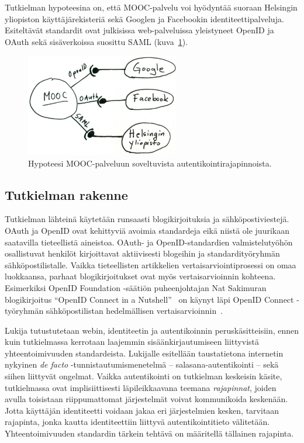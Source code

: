 \documentclass[finnish,gradu]{tktltiki}
\begin{document}
Tutkielman hypoteesina on, että MOOC-palvelu voi hyödyntää suoraan Helsingin yliopiston käyttäjärekisteriä sekä Googlen ja Facebookin identiteettipalveluja. Esiteltävät standardit ovat julkisissa web-palveluissa yleistyneet OpenID ja OAuth sekä sisäverkoissa suosittu SAML (kuva~\ref{fig:mooc-autentikointirajapinnat}).

\begin{figure}
  \centering
  \includegraphics[width=0.6\textwidth]{images/mooc-autentikointirajapinnat.jpg}
  \caption{Hypoteesi MOOC-palveluun soveltuvista autentikointirajapinnoista.}
  \label{fig:mooc-autentikointirajapinnat}
\end{figure}




\subsection{Tutkielman rakenne} %
\label{sub:tutkielman_rakenne}

Tutkielman lähteinä käytetään runsaasti blogikirjoituksia ja sähköpostiviestejä. OAuth ja OpenID ovat kehittyviä avoimia standardeja eikä niistä ole juurikaan saatavilla tieteellistä aineistoa. OAuth- ja OpenID-standardien valmistelutyöhön osallistuvat henkilöt kirjoittavat aktiivisesti blogeihin ja standardityöryhmän sähköpostilistalle. Vaikka tieteellisten artikkelien vertaisarviointiprosessi on omaa luokkaansa, parhaat blogikirjoitukset ovat myös vertaisarvioinnin kohteena. Esimerkiksi OpenID Foundation -säätiön puheenjohtajan Nat Sakimuran blogikirjoitus ``OpenID Connect in a Nutshell''~\cite{sakimura_openid_c_nutshell_2012} on käynyt läpi OpenID Connect -työryhmän sähköpostilistan hedelmällisen vertaisarvioinnin~\cite{openid_c_nutshell_peer_review_1_2012, openid_c_nutshell_peer_review_2_2012}.

Lukija tutustutetaan webin, identiteetin ja autentikoinnin peruskäsitteisiin, ennen kuin tutkielmassa kerrotaan laajemmin sisäänkirjautumiseen liittyvistä yhteentoimivuuden standardeista. Lukijalle esitellään taustatietona internetin nykyinen \emph{de facto} -tunnistautumismenetelmä -- salasana-autentikointi -- sekä siihen liittyvät ongelmat. Vaikka autentikointi on tutkielman keskeisin käsite, tutkielmassa ovat implisiittisesti läpileikkaavana teemana \emph{rajapinnat}, joiden avulla toisistaan riippumattomat järjestelmät voivat kommunikoida keskenään. Jotta käyttäjän identiteetti voidaan jakaa eri järjestelmien kesken, tarvitaan rajapinta, jonka kautta identiteettiin liittyvä autentikointitieto välitetään. Yhteentoimivuuden standardin tärkein tehtävä on määritellä tällainen rajapinta.
\end{document}
